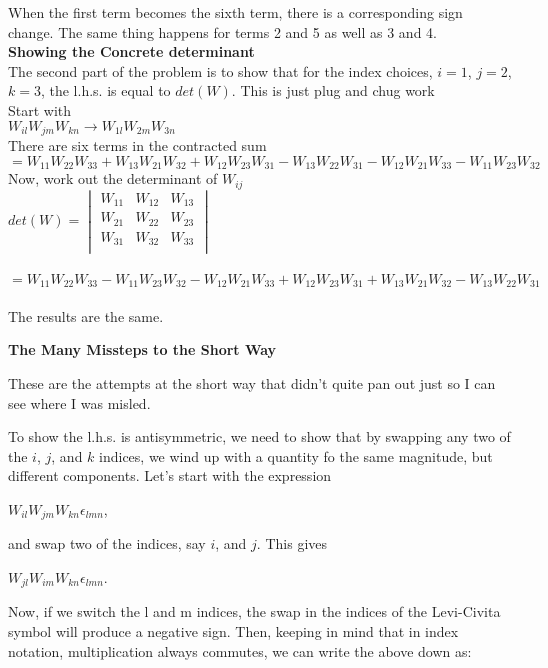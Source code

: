 \documentclass[prb,preprint]
{revtex4-1}
\begin{document}
When the first term becomes the sixth term, there is a corresponding sign change.  The same thing happens for terms 2 and 5 as well as 3 and 4.
\\

{\bf Showing the Concrete determinant}\\

The second part of the problem is to show that for the index choices, $i = 1$, $j = 2$, $k = 3$, the l.h.s. is equal to $det\left(W\right)$.  This is just plug and chug work\\
Start with\\
$W_{il}W_{jm}W_{kn} \rightarrow W_{1l}W_{2m}W_{3n}$\\
There are six terms in the contracted sum\\
$= W_{11}W_{22}W_{33} + W_{13}W_{21}W_{32} + W_{12}W_{23}W_{31} - W_{13}W_{22}W_{31} - W_{12}W_{21}W_{33} - W_{11}W_{23}W_{32}$
\\
Now, work out the determinant of $W_{ij}$
\\
$det\left(W\right) = \begin{vmatrix}
W_{11} & W_{12} & W_{13}\\
W_{21} & W_{22} & W_{23}\\
W_{31} & W_{32} & W_{33}\\
\end{vmatrix}$\\\\
$=W_{11}W_{22}W_{33} - W_{11}W_{23}W_{32} - W_{12}W_{21}W_{33} + W_{12}W_{23}W_{31} + W_{13}W_{21}W_{32} - W_{13}W_{22}W_{31}$\\\\
The results are the same.


\bigskip
\textbf{The Many Missteps to the Short Way}

These are the attempts at the short way that didn't quite pan out just so I can see where I was misled.

To show the l.h.s. is antisymmetric, we need to show that by swapping any two of the $i$, $j$, and $k$ indices, we wind up with a quantity fo the same magnitude, but different components.  Let's start with the expression

$W_{il}W_{jm}W_{kn}\epsilon_{lmn}$,

and swap two of the indices, say $i$, and $j$.  This gives

$W_{jl}W_{im}W_{kn}\epsilon_{lmn}$.

Now, if we switch the l and m indices, the swap in the indices of the Levi-Civita symbol will produce a negative sign. Then, keeping in mind that in index notation, multiplication always commutes, we can write the above down as:
\end{document}
